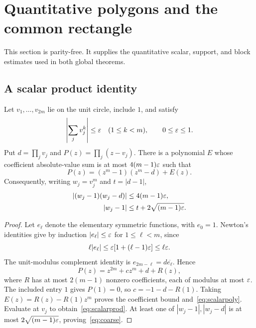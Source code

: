 \section{Quantitative polygons and the common rectangle}\label{sec:core}
This section is parity-free. It supplies the quantitative scalar, support, and block estimates used in both global theorems.

\subsection{A scalar product identity}
\begin{lemma}\label{lem:scalar}
Let $v_1,\ldots,v_{2m}$ lie on the unit circle, include $1$, and satisfy
\[
 \left|\sum_jv_j^k\right|\le\varepsilon\quad(1\le k<m),\qquad 0\le\varepsilon\le1.
\]
Put $d=\prod_jv_j$ and $P(z)=\prod_j(z-v_j)$. There is a polynomial $E$ whose coefficient absolute-value sum is at most $4(m-1)\varepsilon$ such that
\begin{equation}\label{eq:scalarpoly}
 P(z)=(z^m-1)(z^m-d)+E(z).
\end{equation}
Consequently, writing $w_j=v_j^m$ and $t=|d-1|$,
\begin{align}
 |(w_j-1)(w_j-d)|&\le4(m-1)\varepsilon,\label{eq:scalarprod}\\
 |w_j-1|&\le t+2\sqrt{(m-1)\varepsilon}.\label{eq:coarse}
\end{align}
\end{lemma}
\begin{proof}
Let $e_\ell$ denote the elementary symmetric functions, with $e_0=1$. Newton's identities give by induction $|e_\ell|\le\varepsilon$ for $1\le\ell<m$, since
\[
 \ell|e_\ell|\le\varepsilon[1+(\ell-1)\varepsilon]\le\ell\varepsilon.
\]
The unit-modulus complement identity is $e_{2m-\ell}=d\overline{e_\ell}$. Hence
\[
 P(z)=z^{2m}+cz^m+d+R(z),
\]
where $R$ has at most $2(m-1)$ nonzero coefficients, each of modulus at most $\varepsilon$. The included entry $1$ gives $P(1)=0$, so $c=-1-d-R(1)$. Taking $E(z)=R(z)-R(1)z^m$ proves the coefficient bound and~\eqref{eq:scalarpoly}. Evaluate at $v_j$ to obtain~\eqref{eq:scalarprod}. At least one of $|w_j-1|,|w_j-d|$ is at most $2\sqrt{(m-1)\varepsilon}$, proving~\eqref{eq:coarse}.
\end{proof}


